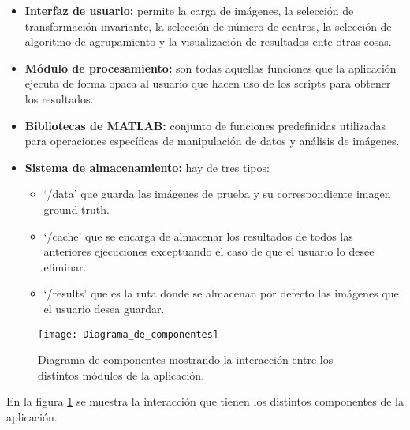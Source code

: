\begin{itemize}
    \item \textbf{Interfaz de usuario:} permite la carga de imágenes, la selección de transformación invariante, la selección de número de centros, la selección de algoritmo de agrupamiento y la visualización de resultados ente otras cosas.
    \item \textbf{Módulo de procesamiento:} son todas aquellas funciones que la aplicación ejecuta de forma opaca al usuario que hacen uso de los scripts para obtener los resultados.
    \item \textbf{Bibliotecas de MATLAB:} conjunto de funciones predefinidas utilizadas para operaciones específicas de manipulación de datos y análisis de imágenes.
    \item \textbf{Sistema de almacenamiento:} hay de tres tipos:
        \begin{itemize}
            \item `/data' que guarda las imágenes de prueba y su correspondiente imagen ground truth.
            \item `/cache' que se encarga de almacenar los resultados de todos las anteriores ejecuciones exceptuando el caso de que el usuario lo desee eliminar.
            \item `/results' que es la ruta donde se almacenan por defecto las imágenes que el usuario desea guardar.
        \end{itemize}
\end{itemize}

\begin{figure}[!h]
    \centering
    \texttt{[image: Diagrama\_de\_componentes]}
    \caption{Diagrama de componentes mostrando la interacción entre los distintos módulos de la aplicación.}\label{fig:Diagrama_de_componentes}
\end{figure}

En la figura \ref{fig:Diagrama_de_componentes} se muestra la interacción que tienen los distintos componentes de la aplicación.
